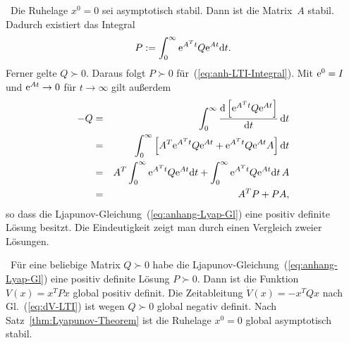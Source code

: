 \begin{svmultproof2}
\hinreichend\ Die Ruhelage $x^{0}=0$ sei asymptotisch stabil. Dann
ist die Matrix~$A$ stabil. Dadurch existiert das Integral
\begin{equation}
P:=\int_{0}^{\infty}{\mathrm{e}}^{A^{T}t}Q{\mathrm{e}}^{At}{\mathrm{d}} t.\label{eq:anh-LTI-Integral}
\end{equation}
Ferner gelte $Q\succ0$. Daraus folgt $P\succ0$ für~(\ref{eq:anh-LTI-Integral}).
Mit ${\mathrm{e}}^{0}=I$ und ${\mathrm{e}}^{At}\to0$ für $t\to\infty$ gilt außerdem
\begin{eqnarray*}
-Q & = & \int_{0}^{\infty}\frac{{\mathrm{d}}\left[{\mathrm{e}}^{A^{T}t}Q{\mathrm{e}}^{At}\right]}{{\mathrm{d}} t}\,{\mathrm{d}} t\\
 & = & \int_{0}^{\infty}\left[A^{T}{\mathrm{e}}^{A^{T}t}Q{\mathrm{e}}^{At}+{\mathrm{e}}^{A^{T}t}Q{\mathrm{e}}^{At}A\right]{\mathrm{d}} t\\
 & = & A^{T}\int_{0}^{\infty}{\mathrm{e}}^{A^{T}t}Q{\mathrm{e}}^{At}{\mathrm{d}} t+\int_{0}^{\infty}{\mathrm{e}}^{A^{T}t}Q{\mathrm{e}}^{At}{\mathrm{d}} t\,A\\
 & = & A^{T}P+PA,
\end{eqnarray*}
so dass die Ljapunov-Gleichung~(\ref{eq:anhang-Lyap-Gl}) eine positiv
definite Lösung besitzt. Die Eindeutigkeit zeigt man durch einen Vergleich
zweier Lösungen.

\notwendig\ Für eine beliebige Matrix $Q\succ0$ habe die Ljapunov-Gleichung~(\ref{eq:anhang-Lyap-Gl})
eine positiv definite Lösung $P\succ0$. Dann ist die Funktion $V(x)=x^{T}Px$
global positiv definit. Die Zeitableitung $\dot{V}(x)=-x^{T}Qx$ nach
Gl.~(\ref{eq:dV-LTI}) ist wegen $Q\succ0$ global negativ definit.
Nach Satz~\ref{thm:Lyapunov-Theorem} ist die Ruhelage $x^{0}=0$
global asymptotisch stabil.
\end{svmultproof2}


